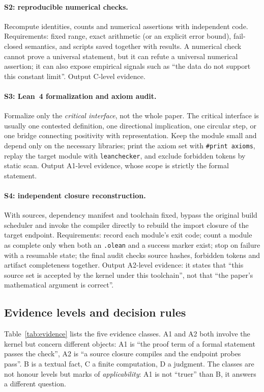 \documentclass[11pt,a4paper]{article}
\theoremstyle{plain}
\theoremstyle{definition}
\begin{document}
\paragraph{S2: reproducible numerical checks.}
Recompute identities, counts and numerical assertions with independent code. Requirements: fixed range, exact arithmetic (or an explicit error bound), fail-closed semantics, and scripts saved together with results. A numerical check cannot prove a universal statement, but it can refute a universal numerical assertion; it can also expose empirical signals such as ``the data do not support this constant limit''. Output C-level evidence.

\paragraph{S3: Lean~4 formalization and axiom audit.}
Formalize only the \emph{critical interface}, not the whole paper. The critical interface is usually one contested definition, one directional implication, one circular step, or one bridge connecting positivity with representation. Keep the module small and depend only on the necessary libraries; print the axiom set with \texttt{\#print axioms}, replay the target module with \texttt{leanchecker}, and exclude forbidden tokens by static scan. Output A1-level evidence, whose scope is strictly the formal statement.

\paragraph{S4: independent closure reconstruction.}
With sources, dependency manifest and toolchain fixed, bypass the original build scheduler and invoke the compiler directly to rebuild the import closure of the target endpoint. Requirements: record each module's exit code; count a module as complete only when both an \texttt{.olean} and a success marker exist; stop on failure with a resumable state; the final audit checks source hashes, forbidden tokens and artifact completeness together. Output A2-level evidence: it states that ``this source set is accepted by the kernel under this toolchain'', not that ``the paper's mathematical argument is correct''.

\subsection{Evidence levels and decision rules}
\label{sec:evidence}

Table~\ref{tab:evidence} lists the five evidence classes. A1 and A2 both involve the kernel but concern different objects: A1 is ``the proof term of a formal statement passes the check'', A2 is ``a source closure compiles and the endpoint probes pass''. B is a textual fact, C a finite computation, D a judgment. The classes are not honour levels but marks of \emph{applicability}: A1 is not ``truer'' than B, it answers a different question.
\end{document}
